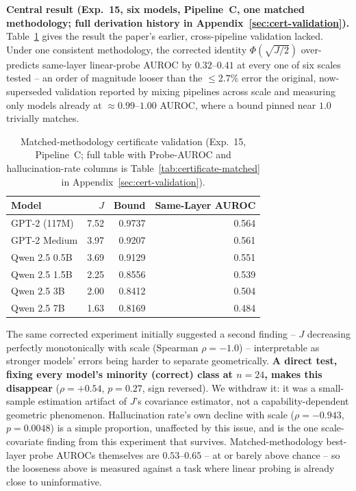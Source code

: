 \documentclass[onecolumn]{jmlr}
\begin{document}
\textbf{Central result (Exp.~15, six models, Pipeline~C, one matched
methodology; full derivation history in Appendix~\ref{sec:cert-validation}).}
Table~\ref{tab:main-central} gives the result the paper's earlier,
cross-pipeline validation lacked. Under one consistent methodology, the
corrected identity $\Phi(\sqrt{J/2})$ over-predicts same-layer
linear-probe AUROC by $0.32$--$0.41$ at every one of six scales tested
-- an order of magnitude looser than the $\leq2.7\%$ error the original,
now-superseded validation reported by mixing pipelines across scale and
measuring only models already at ${\approx}0.99$--$1.00$ AUROC, where a
bound pinned near $1.0$ trivially matches.

\begin{table}[!htbp]
\centering
\caption{Matched-methodology certificate validation (Exp.~15, Pipeline~C;
  full table with Probe-AUROC and hallucination-rate columns is
  Table~\ref{tab:certificate-matched} in Appendix~\ref{sec:cert-validation}).}
\label{tab:main-central}
\small
\begin{tabular}{lrrr}
\toprule
\textbf{Model} & $J$ & \textbf{Bound} & \textbf{Same-Layer AUROC} \\
\midrule
GPT-2 (117M)   & 7.52 & 0.9737 & 0.564 \\
GPT-2 Medium   & 3.97 & 0.9207 & 0.561 \\
Qwen 2.5 0.5B  & 3.69 & 0.9129 & 0.551 \\
Qwen 2.5 1.5B  & 2.25 & 0.8556 & 0.539 \\
Qwen 2.5 3B    & 2.00 & 0.8412 & 0.504 \\
Qwen 2.5 7B    & 1.63 & 0.8169 & 0.484 \\
\bottomrule
\end{tabular}
\end{table}

The same corrected experiment initially suggested a second finding --
$J$ decreasing perfectly monotonically with scale (Spearman
$\rho=-1.0$) -- interpretable as stronger models' errors being harder to
separate geometrically. \textbf{A direct test, fixing every model's
minority (correct) class at $n=24$, makes this disappear} ($\rho=+0.54$,
$p=0.27$, sign reversed). We withdraw it: it was a small-sample
estimation artifact of $J$'s covariance estimator, not a
capability-dependent geometric phenomenon. Hallucination rate's own
decline with scale ($\rho=-0.943$, $p=0.0048$) is a simple proportion,
unaffected by this issue, and is the one scale-covariate finding from
this experiment that survives. Matched-methodology best-layer probe AUROCs
themselves are $0.53$--$0.65$ -- at or barely above chance -- so the
looseness above is measured against a task where linear probing is
already close to uninformative.
\end{document}
